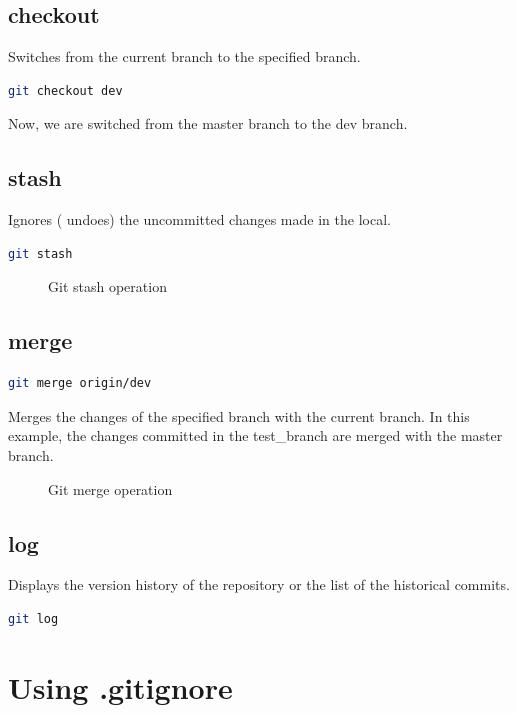 \documentclass[letterpaper]{article}
\begin{document}
\subsection{checkout}
Switches from the current branch to the specified branch.

\begin{lstlisting}[language=Bash]
git checkout dev
\end{lstlisting}

Now, we are switched from the master branch to the dev branch.


\subsection{stash}
Ignores ( undoes) the uncommitted changes made in the local.
\begin{lstlisting}[language=Bash]
git stash
\end{lstlisting}

\begin{figure}[h]
    \centering
    \caption{Git stash operation}
  \end{figure}





\subsection{merge}
\begin{lstlisting}[language=Bash]
git merge origin/dev
\end{lstlisting}
Merges the changes of the specified branch with the current branch. In this example, the changes committed in the test\_branch are merged with the master branch. 

\begin{figure}[h]
    \centering
    \caption{Git merge operation}
  \end{figure}

\subsection{log}
Displays the version history of the repository or the list of the historical commits. 
\begin{lstlisting}[language=Bash]
git log
\end{lstlisting}

\section{Using .gitignore}
\end{document}
